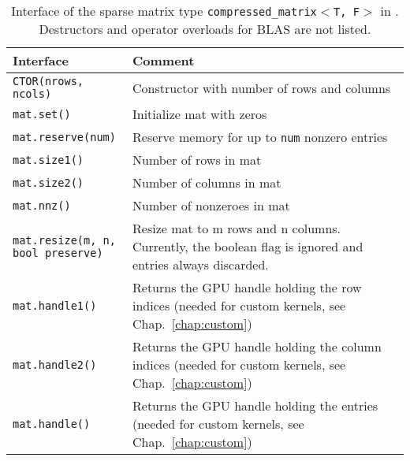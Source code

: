 \begin{table}[tb]
\begin{center}
\begin{tabular}{p{6.5cm}|p{8cm}}
Interface & Comment\\
\hline
\texttt{CTOR(nrows, ncols)}    & Constructor with number of rows and columns \\
\texttt{mat.set()}    & Initialize mat with zeros \\
\texttt{mat.reserve(num)}    & Reserve memory for up to \texttt{num} nonzero entries \\

\texttt{mat.size1()}            & Number of rows in mat \\
\texttt{mat.size2()}            & Number of columns in mat \\
\texttt{mat.nnz()}		& Number of nonzeroes in mat \\
\parbox{6cm}{\texttt{mat.resize(m, n, \\
           \hphantom{mat.resize(}bool preserve)}}    & Resize mat to m rows and n columns. Currently, the boolean flag is ignored and entries always discarded. \\
\texttt{mat.handle1()}  & Returns the GPU handle holding the row indices (needed for custom kernels, see Chap.~\ref{chap:custom}) \\
\texttt{mat.handle2()}  & Returns the GPU handle holding the column indices  (needed for custom kernels, see Chap.~\ref{chap:custom}) \\
\texttt{mat.handle()}  & Returns the GPU handle holding the entries (needed for custom kernels, see Chap.~\ref{chap:custom})
\end{tabular}
\caption{Interface of the sparse matrix type \texttt{compressed\_matrix$<$T, F$>$} in \ViennaCL. Destructors and operator overloads for BLAS are not listed.}
\label{tab:compressed-matrix-interface}
\end{center}
\end{table}

